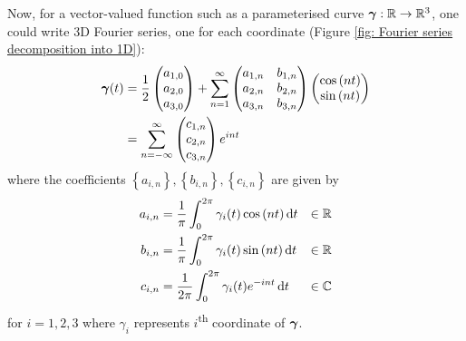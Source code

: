 \documentclass[../dissertation.tex]{subfiles}
\begin{document}
Now, for a vector-valued function such as a parameterised curve $\boldsymbol{\gamma}:\mathbb{R} \rightarrow \mathbb{R}^3$, one could write 3D Fourier series,
one for each coordinate (Figure \ref{fig: Fourier series decomposition into 1D}):
\begin{align}
    \mathbf{\boldsymbol{\gamma}} (t) &= \frac{1}{2}
    \begin{pmatrix}
        a_{1,0} \\
        a_{2,0} \\
        a_{3,0}
    \end{pmatrix}
    + \sum_{n=1}^\infty
    \begin{pmatrix}
        a_{1,n} & b_{1,n} \\
        a_{2,n} & b_{2,n} \\
        a_{3,n} & b_{3,n}
    \end{pmatrix}
    \begin{pmatrix}
        \cos {\left( nt \right)} \\
        \sin {\left( nt \right)}
    \end{pmatrix}
    \\
    &= \sum_{n=-\infty}^{\infty}
    \begin{pmatrix}
        c_{1,n} \\
        c_{2,n} \\
        c_{3,n}
    \end{pmatrix}
    e^{int}
\end{align}
where the coefficients $\left\{ a_{i,n} \right\}, \left\{ b_{i,n} \right\}, \left\{ c_{i,n} \right\}$ are given by
\begin{align}
    a_{i,n} &= \frac{1}{\pi} \int_{0}^{2\pi} \gamma_i (t) \cos {\left( nt \right)} \, \text{d} t & \in \mathbb{R}\\
    b_{i,n} &= \frac{1}{\pi} \int_{0}^{2\pi} \gamma_i (t) \sin {\left( nt \right)} \, \text{d} t & \in \mathbb{R}\\
    c_{i,n} &= \frac{1}{2\pi} \int_{0}^{2\pi} \gamma_i (t) e^{-int} \, \text{d} t & \in \mathbb{C}
\end{align}
for $i=1, 2, 3$ where $\gamma_i$ represents $i$\textsuperscript{th} coordinate of $\boldsymbol{\gamma}$.
\end{document}
